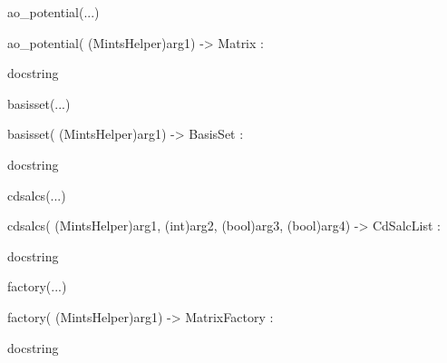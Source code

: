 \documentclass[letterpaper,10pt,english]{sphinxmanual}
\begin{document}
\begin{description}
\begin{description}
\begin{DUlineblock}{0em}
\begin{DUlineblock}{\DUlineblockindent}
\begin{DUlineblock}{\DUlineblockindent}
\end{DUlineblock}
\end{DUlineblock}
\item[] ao\_potential(...)
\item[]
\begin{DUlineblock}{\DUlineblockindent}
\item[] ao\_potential( (MintsHelper)arg1) -\textgreater{} Matrix :
\item[]
\begin{DUlineblock}{\DUlineblockindent}
\item[] docstring
\item[] 
\end{DUlineblock}
\end{DUlineblock}
\item[] basisset(...)
\item[]
\begin{DUlineblock}{\DUlineblockindent}
\item[] basisset( (MintsHelper)arg1) -\textgreater{} BasisSet :
\item[]
\begin{DUlineblock}{\DUlineblockindent}
\item[] docstring
\item[] 
\end{DUlineblock}
\end{DUlineblock}
\item[] cdsalcs(...)
\item[]
\begin{DUlineblock}{\DUlineblockindent}
\item[] cdsalcs( (MintsHelper)arg1, (int)arg2, (bool)arg3, (bool)arg4) -\textgreater{} CdSalcList :
\item[]
\begin{DUlineblock}{\DUlineblockindent}
\item[] docstring
\item[] 
\end{DUlineblock}
\end{DUlineblock}
\item[] factory(...)
\item[]
\begin{DUlineblock}{\DUlineblockindent}
\item[] factory( (MintsHelper)arg1) -\textgreater{} MatrixFactory :
\item[]
\begin{DUlineblock}{\DUlineblockindent}
\item[] docstring
\item[] 

\end{DUlineblock}
\end{DUlineblock}
\end{DUlineblock}
\end{description}
\end{description}
\end{document}
